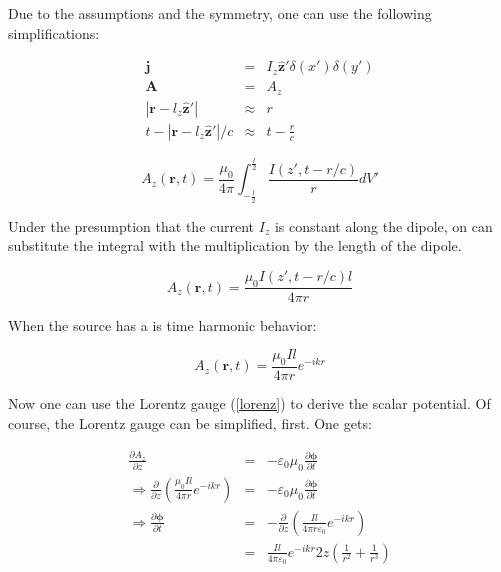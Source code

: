 \documentclass[a4paper,14pt]{extbook}
\begin{document}
Due to the assumptions and the symmetry, one can use the following simplifications:

\begin{eqnarray}
  \mathbf{j} &=& I_z\mathbf{ \hat{z}'} \delta (x') \delta (y') \label{hd_simpli_1}\\
\mathbf{A} &=& A_z \label{hd_simpli_2} \\
|\mathbf{r}-l_z\mathbf{ \hat{z}'}| &\approx& r \label{hd_simpli_3}\\
t-|\mathbf{r}-l_z\mathbf{ \hat{z}'}| / c &\approx& t-\frac{r}{c}\label{hd_simpli_4}
\end{eqnarray}

\begin{equation}\label{simple_potential_solution}
 A_z (\mathbf{r},t) = \frac{ \mu_0}{4 \pi}\int^{\frac{l}{2}}_{-\frac{l}{2}} \frac{ I ( z', t- r/c  )}{r}  dV'
\end{equation}

Under the presumption that the current $I_z$ is constant along the dipole, on can substitute the integral with the multiplication by the length of the dipole.

\begin{equation}\label{simple_potential_solution2}
 A_z (\mathbf{r},t) = \frac{ \mu_0 I ( z', t- r/c  ) l}{4 \pi r}
\end{equation}

When the source has a is time harmonic behavior:

\begin{equation}\label{simple_potential_solution_timeharmonic}
 A_z (\mathbf{r},t) = \frac{\mu_0 I l}{4 \pi r} e^{-ikr }
\end{equation}

Now one can use the Lorentz gauge (\ref{lorenz}) to derive the scalar potential. Of course, the Lorentz gauge can be simplified, first. One gets:

\begin{eqnarray}
\frac{\partial A_z }{\partial z}&=&-\varepsilon_0 \mu_0\frac{\partial \mathbf{\phi}}{\partial t} \label{lorenz_simplified} \\
\Rightarrow \frac{\partial }{\partial z} \left(  \frac{ \mu_0 I l}{4 \pi r} e^{-ikr } \right) &=&-\varepsilon_0 \mu_0\frac{\partial \mathbf{\phi}}{\partial t} \nonumber \\
\Rightarrow \frac{\partial \mathbf{\phi}}{\partial t} &=&-  \frac{\partial }{\partial z} \left(  \frac{ I l}{4 \pi r \varepsilon_0} e^{-ikr } \right)  \nonumber\\
&=&  \frac{ I l}{4 \pi \varepsilon_0} e^{-ikr } 2z \left( \frac{1}{r^2} + \frac{1}{r^3} \right) \label{diff_eq_scalar_pot}
\end{eqnarray}
\end{document}
